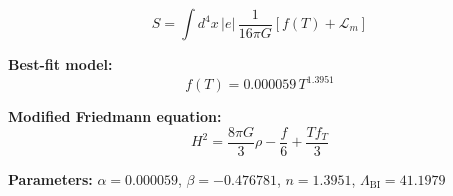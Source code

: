 
\begin{equation}
  S = \int d^4x \, |e| \, \frac{1}{16\pi G} \left[ f(T) + \mathcal{L}_m \right]
\end{equation}

\textbf{Best-fit model:}
\begin{equation}
  f(T) = 0.000059 \, T^{1.3951}
\end{equation}

\textbf{Modified Friedmann equation:}
\begin{equation}
  H^2 = \frac{8\pi G}{3} \rho - \frac{f}{6} + \frac{T f_T}{3}
\end{equation}

\textbf{Parameters:}
$\alpha = 0.000059$, \quad
$\beta = -0.476781$, \quad
$n = 1.3951$, \quad
$\Lambda_{\text{BI}} = 41.1979$